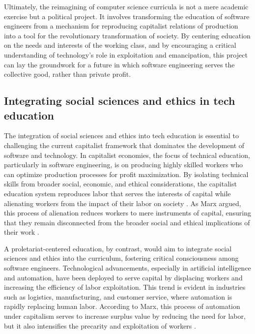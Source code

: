 \begin{refsection}
Ultimately, the reimagining of computer science curricula is not a mere academic exercise but a political project. It involves transforming the education of software engineers from a mechanism for reproducing capitalist relations of production into a tool for the revolutionary transformation of society. By centering education on the needs and interests of the working class, and by encouraging a critical understanding of technology’s role in exploitation and emancipation, this project can lay the groundwork for a future in which software engineering serves the collective good, rather than private profit.

\subsection{Integrating social sciences and ethics in tech education}

The integration of social sciences and ethics into tech education is essential to challenging the current capitalist framework that dominates the development of software and technology. In capitalist economies, the focus of technical education, particularly in software engineering, is on producing highly skilled workers who can optimize production processes for profit maximization. By isolating technical skills from broader social, economic, and ethical considerations, the capitalist education system reproduces labor that serves the interests of capital while alienating workers from the impact of their labor on society \cite[pp.~78]{braverman1999labor}. As Marx argued, this process of alienation reduces workers to mere instruments of capital, ensuring that they remain disconnected from the broader social and ethical implications of their work \cite[pp.~45]{marx2008capital}.

A proletariat-centered education, by contrast, would aim to integrate social sciences and ethics into the curriculum, fostering critical consciousness among software engineers. Technological advancements, especially in artificial intelligence and automation, have been deployed to serve capital by displacing workers and increasing the efficiency of labor exploitation. This trend is evident in industries such as logistics, manufacturing, and customer service, where automation is rapidly replacing human labor. According to Marx, this process of automation under capitalism serves to increase surplus value by reducing the need for labor, but it also intensifies the precarity and exploitation of workers \cite[pp.~73]{marx1974communist}.


\end{refsection}
